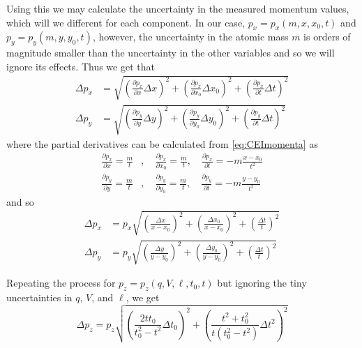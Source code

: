 Using this we may calculate the uncertainty in the measured momentum values, which will we different for each component. In our case, $p_x = p_x(m,x,x_0,t)$ and $p_y = p_y(m,y,y_0,t)$, however, the uncertainty in the atomic mass $m$ is orders of magnitude smaller than the uncertainty in the other variables and so we will ignore its effects. Thus we get that
\begin{subequations}
  \begin{align}
  \Delta p_x &= \sqrt{
    \left( \frac{\partial p_x}{\partial x}\Delta x \right)^2
    + \left( \frac{\partial p_x}{\partial x_0}\Delta x_0 \right)^2
    + \left(\frac{\partial p_x}{\partial t}\Delta t \right)^2
   } \\
  \Delta p_y &= \sqrt{
    \left( \frac{\partial p_y}{\partial y}\Delta y \right)^2
    + \left(\frac{\partial p_y}{\partial y_0}\Delta y_0 \right)^2
    + \left(\frac{\partial p_y}{\partial t}\Delta t \right)^2
  }
  \end{align}
\end{subequations}
where the partial derivatives can be calculated from \eqref{eq:CEImomenta} as
\begin{subequations}
  \begin{align}
  \frac{\partial p_x}{\partial x} = \frac{m}{t} &,\quad \frac{\partial p_x}{\partial x_0} = \frac{m}{t} ,\quad \frac{\partial p_x}{\partial t} = -m\frac{x-x_0}{t^2}\\
  \frac{\partial p_y}{\partial y} = \frac{m}{t} &,\quad \frac{\partial p_y}{\partial y_0} = \frac{m}{t} ,\quad \frac{\partial p_y}{\partial t} = -m\frac{y-y_0}{t^2}
  \end{align}
\end{subequations}
and so
\begin{subequations}
  \begin{align}
  \Delta p_x &= p_x \sqrt{
    \left( \frac{\Delta x}{x - x_0} \right)^2
    + \left( \frac{\Delta x_0}{x - x_0} \right)^2
    + \left( \frac{\Delta t}{t} \right)^2 } \\
  \Delta p_y &= p_y \sqrt{
    \left( \frac{\Delta y}{y - y_0} \right)^2
    + \left( \frac{\Delta y_0}{y - y_0} \right)^2
    + \left( \frac{\Delta t}{t} \right)^2 }
  \end{align}
\end{subequations}

Repeating the process for $p_z = p_z(q,V,\ell,t_0,t)$ but ignoring the tiny uncertainties in $q$, $V$, and $\ell$, we get
\begin{equation}
\Delta p_z = p_z \sqrt{
  \left( \frac{2tt_0}{t_0^2 - t^2} \Delta t_0 \right)^2
  + \left( \frac{t^2 + t_0^2}{t(t_0^2 - t^2)} \Delta t^2 \right)^2
}
\end{equation}

